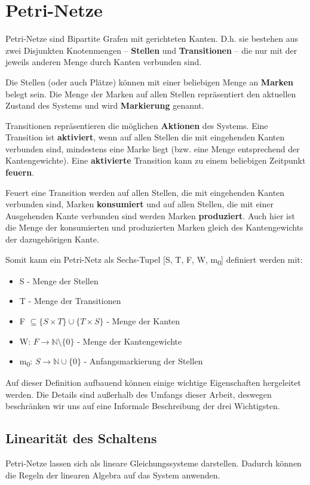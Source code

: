 

\chapter{Petri-Netze}
Petri-Netze sind Bipartite Grafen mit gerichteten Kanten.
D.h. sie bestehen aus zwei Disjunkten Knotenmengen -- \textbf{Stellen} und \textbf{Transitionen} -- die nur mit der jeweils anderen Menge durch Kanten verbunden sind.

Die Stellen (oder auch Plätze) können mit einer beliebigen Menge an \textbf{Marken} belegt sein.
Die Menge der Marken auf allen Stellen repräsentiert den aktuellen Zustand des Systems und wird \textbf{Markierung} genannt.

Transitionen repräsentieren die möglichen \textbf{Aktionen} des Systems. 
Eine Transition ist \textbf{aktiviert}, wenn auf allen Stellen die mit eingehenden Kanten verbunden sind, mindestens eine Marke liegt (bzw. eine Menge entsprechend der Kantengewichte).
Eine \textbf{aktivierte} Transition kann zu einem beliebigen Zeitpunkt \textbf{feuern}.

Feuert eine Transition werden auf allen Stellen, die mit eingehenden Kanten verbunden sind, Marken \textbf{konsumiert} und auf allen Stellen, die mit einer Ausgehenden Kante verbunden sind werden Marken \textbf{produziert}.
Auch hier ist die Menge der konsumierten und produzierten Marken gleich des Kantengewichts der dazugehörigen Kante.

Somit kann ein Petri-Netz als Sechs-Tupel [S, T, F, W, m\textsubscript{0}] definiert werden mit:
\begin{itemize}
    \item S - Menge der Stellen
    \item T - Menge der Transitionen
    \item F $\subseteq \{ S \times T \} \cup \{ T \times S \}$ - Menge der Kanten
    \item W: $ F \to \mathbb{N} \setminus \{0\}$ - Menge der Kantengewichte
    \item m\textsubscript{0}: $S \to \mathbb{N} \cup \{0\}$ - Anfangsmarkierung der Stellen
\end{itemize}
Auf dieser Definition aufbauend können einige wichtige Eigenschaften hergeleitet werden.
Die Details sind außerhalb des Umfangs dieser Arbeit, deswegen beschränken wir uns auf eine Informale Beschreibung der drei Wichtigsten.

\section{Linearität des Schaltens}
Petri-Netze lassen sich als lineare Gleichungssysteme darstellen. 
Dadurch können die Regeln der linearen Algebra auf das System anwenden. 

